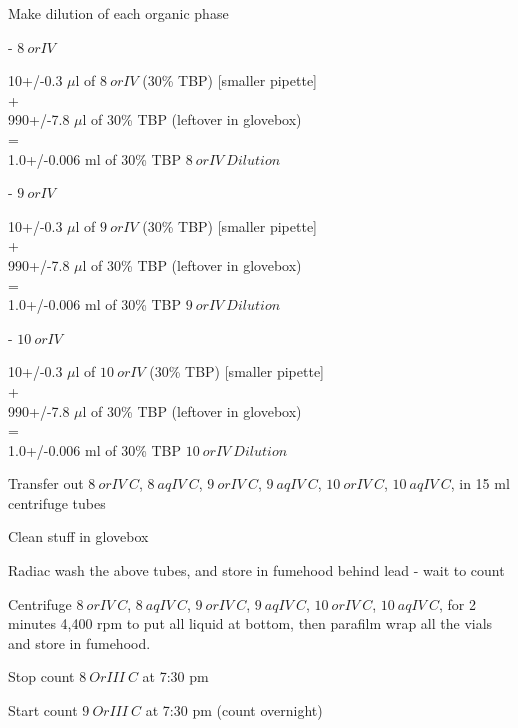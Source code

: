 \documentclass[idxtotoc,hyperref,openany,oneside]{labbook} %
\newcommand{\cmark}{\ding{51}}%
\newcommand{\done}{\rlap{$\square$}{\raisebox{2pt}{\large\hspace{1pt}\cmark}}%
  \hspace{-2.5pt}}
\begin{document}
\begin{todolist}
\item[\done]{Make dilution of each organic phase}
  \begin{todolist}
  \item[\done]{- $\boxed{8\ orIV}$}
  \end{todolist}
  \begin{center}
    10+/-0.3 $\mu$l of $\boxed{8\ orIV}$
    (30\% TBP) [smaller pipette]\\
    +\\
    990+/-7.8 $\mu$l of 30\% TBP (leftover in glovebox)\\
    =\\
    1.0+/-0.006 ml of 30\% TBP $\boxed{8\ orIV\ Dilution}$
  \end{center}
  \begin{todolist}
  \item[\done]{- $\boxed{9\ orIV}$}
  \end{todolist}
  \begin{center}
    10+/-0.3 $\mu$l of $\boxed{9\ orIV}$
    (30\% TBP) [smaller pipette]\\
    +\\
    990+/-7.8 $\mu$l of 30\% TBP (leftover in glovebox)\\
    =\\
    1.0+/-0.006 ml of 30\% TBP $\boxed{9\ orIV\ Dilution}$
  \end{center}
  \begin{todolist}
  \item[\done]{- $\boxed{10\ orIV}$}
  \end{todolist}
  \begin{center}
    10+/-0.3 $\mu$l of $\boxed{10\ orIV}$
    (30\% TBP) [smaller pipette]\\
    +\\
    990+/-7.8 $\mu$l of 30\% TBP (leftover in glovebox)\\
    =\\
    1.0+/-0.006 ml of 30\% TBP $\boxed{10\ orIV\ Dilution}$
  \end{center}
 
\item[\done]{Transfer out $\boxed{8\ orIV\ C}$, $\boxed{8\ aqIV\ C}$,
  $\boxed{9\ orIV\ C}$, $\boxed{9\ aqIV\ C}$, $\boxed{10\ orIV\ C}$,
  $\boxed{10\ aqIV\ C}$, in 15 ml centrifuge tubes}
\item[\done]{Clean stuff in glovebox}
\item[\done]{Radiac wash the above tubes, and store in fumehood behind
  lead - wait to count}
\item[\done]{Centrifuge $\boxed{8\ orIV\ C}$, $\boxed{8\ aqIV\ C}$,
  $\boxed{9\ orIV\ C}$, $\boxed{9\ aqIV\ C}$, $\boxed{10\ orIV\ C}$,
  $\boxed{10\ aqIV\ C}$, for 2 minutes 4,400 rpm to put all liquid at
  bottom, then parafilm wrap all the vials and store in fumehood.}
\item[\done]{Stop count $\boxed{8\ OrIII\ C}$ at 7:30 pm}
\item[\done]{Start count $\boxed{9\ OrIII\ C}$ at 7:30 pm
           (count overnight)} 
\end{todolist}
\end{document}
